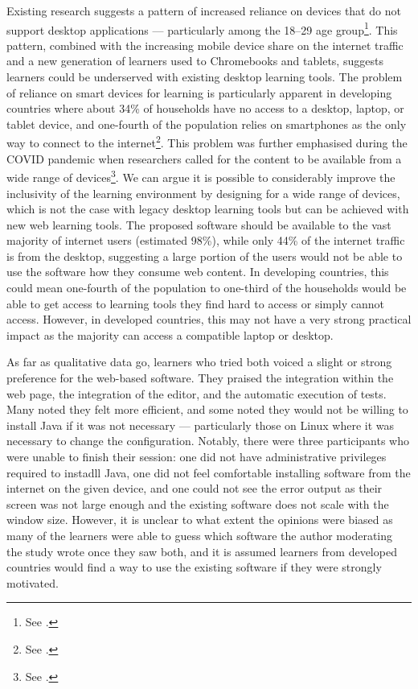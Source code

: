 {Existing research suggests a pattern of increased reliance on devices that do not support desktop applications --- particularly among the 18--29 age group\footnote{See .}.
This pattern, combined with the increasing mobile device share on the internet traffic and a new generation of learners used to Chromebooks and tablets, suggests learners could be underserved with existing desktop learning tools.
The problem of reliance on smart devices for learning is particularly apparent in developing countries where about 34\% of households have no access to a desktop, laptop, or tablet device, and one-fourth of the population relies on smartphones as the only way to connect to the internet\footnote{See .}.
This problem was further emphasised during the COVID pandemic when researchers called for the content to be available from a wide range of devices\footnote{See .}.
We can argue it is possible to considerably improve the inclusivity of the learning environment by designing for a wide range of devices, which is not the case with legacy desktop learning tools but can be achieved with new web learning tools.
The proposed software should be available to the vast majority of internet users (estimated 98\%), while only 44\% of the internet traffic is from the desktop, suggesting a large portion of the users would not be able to use the software how they consume web content.
In developing countries, this could mean one-fourth of the population to one-third of the households would be able to get access to learning tools they find hard to access or simply cannot access.
However, in developed countries, this may not have a very strong practical impact as the majority can access a compatible laptop or desktop.

As far as qualitative data go, learners who tried both voiced a slight or strong preference for the web-based software.
They praised the integration within the web page, the integration of the editor, and the automatic execution of tests.
Many noted they felt more efficient, and some noted they would not be willing to install Java if it was not necessary --- particularly those on Linux where it was necessary to change the configuration.
Notably, there were three participants who were unable to finish their session: one did not have administrative privileges required to instadll Java, one did not feel comfortable installing software from the internet on the given device, and one could not see the error output as their screen was not large enough and the existing software does not scale with the window size.
However, it is unclear to what extent the opinions were biased as many of the learners were able to guess which software the author moderating the study wrote once they saw both, and it is assumed learners from developed countries would find a way to use the existing software if they were strongly motivated.

}
